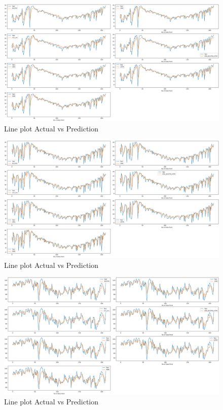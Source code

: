 \documentclass[a4paper,fleqn]{cas-sc}
\begin{document}
\begin{figure}[!ht]
\centering
\includegraphics[width=\textwidth]{AHMEDABAD2._act vs pred}
\caption{Line plot Actual vs Prediction}
\label{fig:Line plot}
\end{figure}


\begin{figure}[!ht]
\centering
\includegraphics[width=\textwidth]{Ajmer_act vs pred (2)}
\caption{Line plot Actual vs Prediction}
\label{fig:Line plot}
\end{figure}



\begin{figure}[!ht]
\centering
\includegraphics[width=\textwidth]{Bengaluru_act vs pred}
\caption{Line plot Actual vs Prediction}
\label{fig:Line plot}
\end{figure}
\end{document}
